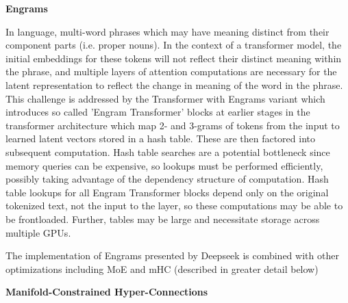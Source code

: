\documentclass{article}
\begin{document}
\textbf{Engrams}

In language, multi-word phrases which may have meaning distinct from their component parts (i.e. proper nouns). In the context of a transformer model, the initial embeddings for these tokens will not reflect their distinct meaning within the phrase, and multiple layers of attention computations are necessary for the latent representation to reflect the change in meaning of the word in the phrase. This challenge is addressed by the Transformer with Engrams variant \cite{cheng_conditional_2026} which introduces so called 'Engram Transformer' blocks at earlier stages in the transformer architecture which map 2- and 3-grams of tokens from the input to learned latent vectors stored in a hash table. These are then factored into subsequent computation. Hash table searches are a potential bottleneck since memory queries can be expensive, so lookups must be performed efficiently, possibly taking advantage of the dependency structure of computation. Hash table lookups for all Engram Transformer blocks depend only on the original tokenized text, not the input to the layer, so these computations may be able to be frontloaded. Further, tables may be large and necessitate storage across multiple GPUs.

The implementation of Engrams presented by Deepseek is combined with other optimizations including MoE and mHC (described in greater detail below)

\textbf{Manifold-Constrained Hyper-Connections}
\end{document}
